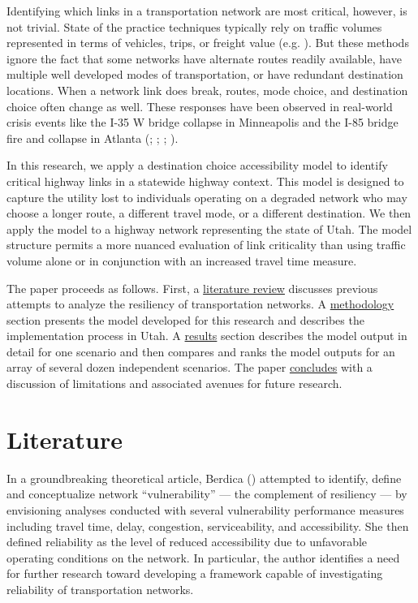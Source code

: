 \documentclass[]{ascelike-new}
\begin{document}
Identifying which links in a transportation network are most critical,
however, is not trivial. State of the practice techniques typically rely
on traffic volumes represented in terms of vehicles, trips, or freight
value (e.g. ). But these methods ignore
the fact that some networks have alternate routes readily available,
have multiple well developed modes of transportation, or have redundant
destination locations. When a network link does break, routes, mode
choice, and destination choice often change as well. These responses
have been observed in real-world crisis events like the I-35 W bridge
collapse in Minneapolis and the I-85 bridge fire and collapse in Atlanta
(;
;
;
).

In this research, we apply a destination choice accessibility model to
identify critical highway links in a statewide highway context. This
model is designed to capture the utility lost to individuals operating
on a degraded network who may choose a longer route, a different travel
mode, or a different destination. We then apply the model to a highway
network representing the state of Utah. The model structure permits a
more nuanced evaluation of link criticality than using traffic volume
alone or in conjunction with an increased travel time measure.

The paper proceeds as follows. First, a \hyperref[litreview]{literature
review} discusses previous attempts to analyze the resiliency of
transportation networks. A \hyperref[methodology]{methodology} section
presents the model developed for this research and describes the
implementation process in Utah. A \hyperref[results]{results} section
describes the model output in detail for one scenario and then compares
and ranks the model outputs for an array of several dozen independent
scenarios. The paper \hyperref[conclusion]{concludes} with a discussion
of limitations and associated avenues for future research.


\section{Literature}\label{litreview}

In a groundbreaking theoretical article, Berdica
() attempted to identify, define
and conceptualize network ``vulnerability'' --- the complement of
resiliency --- by envisioning analyses conducted with several
vulnerability performance measures including travel time, delay,
congestion, serviceability, and accessibility. She then defined
reliability as the level of reduced accessibility due to unfavorable
operating conditions on the network. In particular, the author
identifies a need for further research toward developing a framework
capable of investigating reliability of transportation networks.
\end{document}
